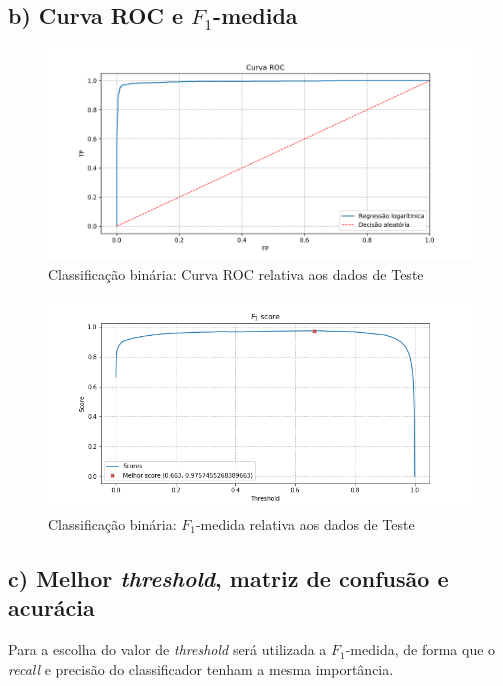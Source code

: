 \documentclass{article}
\begin{document}
    \subsection[]{b) Curva ROC e $F_1$-medida}
        \begin{figure}[H]
            \centering
            \includegraphics[width=\textwidth]{img1/roc.png}
            \caption{Classificação binária: Curva ROC relativa aos dados de Teste}
            \label{fig:a_roc}
        \end{figure}
        \begin{figure}[H]
            \centering
            \includegraphics[width=\textwidth]{img1/f1_score.png}
            \caption{Classificação binária: $F_1$-medida relativa aos dados de Teste}
            \label{fig:a_fi_score}
        \end{figure}
    
    \subsection[]{c) Melhor \textit{threshold}, matriz de confusão e acurácia}
    Para a escolha do valor de \textit{threshold} será utilizada a $F_1$-medida, de forma que
    o \textit{recall} e precisão do classificador tenham a mesma importância.
\end{document}
